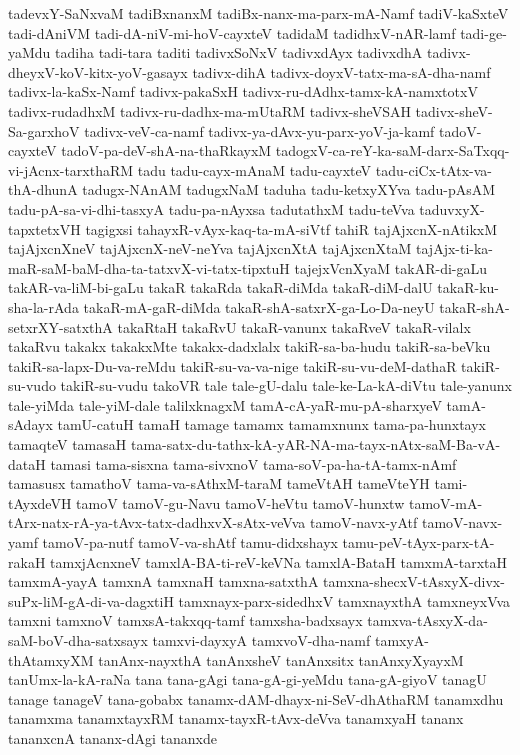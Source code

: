 {tadevxY-SaNxvaM
tadiBxnanxM
tadiBx-nanx-ma-parx-mA-Namf
tadiV-kaSxteV
tadi-dAniVM
tadi-dA-niV-mi-hoV-cayxteV
tadidaM
tadidhxV-nAR-lamf
tadi-ge-yaMdu
tadiha
tadi-tara
taditi
tadivxSoNxV
tadivxdAyx
tadivxdhA
tadivx-dheyxV-koV-kitx-yoV-gasayx
tadivx-dihA
tadivx-doyxV-tatx-ma-sA-dha-namf
tadivx-la-kaSx-Namf
tadivx-pakaSxH
tadivx-ru-dAdhx-tamx-kA-namxtotxV
tadivx-rudadhxM
tadivx-ru-dadhx-ma-mUtaRM
tadivx-sheVSAH
tadivx-sheV-Sa-garxhoV
tadivx-veV-ca-namf
tadivx-ya-dAvx-yu-parx-yoV-ja-kamf
tadoV-cayxteV
tadoV-pa-deV-shA-na-thaRkayxM
tadogxV-ca-reY-ka-saM-darx-SaTxqq-vi-jAcnx-tarxthaRM
tadu
tadu-cayx-mAnaM
tadu-cayxteV
tadu-ciCx-tAtx-va-thA-dhunA
tadugx-NAnAM
tadugxNaM
taduha
tadu-ketxyXYva
tadu-pAsAM
tadu-pA-sa-vi-dhi-tasxyA
tadu-pa-nAyxsa
tadutathxM
tadu-teVva
taduvxyX-tapxtetxVH
tagigxsi
tahayxR-vAyx-kaq-ta-mA-siVtf
tahiR
tajAjxcnX-nAtikxM
tajAjxcnXneV
tajAjxcnX-neV-neYva
tajAjxcnXtA
tajAjxcnXtaM
tajAjx-ti-ka-maR-saM-baM-dha-ta-tatxvX-vi-tatx-tipxtuH
tajejxVcnXyaM
takAR-di-gaLu
takAR-va-liM-bi-gaLu
takaR
takaRda
takaR-diMda
takaR-diM-dalU
takaR-ku-sha-la-rAda
takaR-mA-gaR-diMda
takaR-shA-satxrX-ga-Lo-Da-neyU
takaR-shA-setxrXY-satxthA
takaRtaH
takaRvU
takaR-vanunx
takaRveV
takaR-vilalx
takaRvu
takakx
takakxMte
takakx-dadxlalx
takiR-sa-ba-hudu
takiR-sa-beVku
takiR-sa-lapx-Du-va-reMdu
takiR-su-va-va-nige
takiR-su-vu-deM-dathaR
takiR-su-vudo
takiR-su-vudu
takoVR
tale
tale-gU-dalu
tale-ke-La-kA-diVtu
tale-yanunx
tale-yiMda
tale-yiM-dale
talilxknagxM
tamA-cA-yaR-mu-pA-sharxyeV
tamA-sAdayx
tamU-catuH
tamaH
tamage
tamamx
tamamxnunx
tama-pa-hunxtayx
tamaqteV
tamasaH
tama-satx-du-tathx-kA-yAR-NA-ma-tayx-nAtx-saM-Ba-vA-dataH
tamasi
tama-sisxna
tama-sivxnoV
tama-soV-pa-ha-tA-tamx-nAmf
tamasusx
tamathoV
tama-va-sAthxM-taraM
tameVtAH
tameVteYH
tami-tAyxdeVH
tamoV
tamoV-gu-Navu
tamoV-heVtu
tamoV-hunxtw
tamoV-mA-tArx-natx-rA-ya-tAvx-tatx-dadhxvX-sAtx-veVva
tamoV-navx-yAtf
tamoV-navx-yamf
tamoV-pa-nutf
tamoV-va-shAtf
tamu-didxshayx
tamu-peV-tAyx-parx-tA-rakaH
tamxjAcnxneV
tamxlA-BA-ti-reV-keVNa
tamxlA-BataH
tamxmA-tarxtaH
tamxmA-yayA
tamxnA
tamxnaH
tamxna-satxthA
tamxna-shecxV-tAsxyX-divx-suPx-liM-gA-di-va-dagxtiH
tamxnayx-parx-sidedhxV
tamxnayxthA
tamxneyxVva
tamxni
tamxnoV
tamxsA-takxqq-tamf
tamxsha-badxsayx
tamxva-tAsxyX-da-saM-boV-dha-satxsayx
tamxvi-dayxyA
tamxvoV-dha-namf
tamxyA-thAtamxyXM
tanAnx-nayxthA
tanAnxsheV
tanAnxsitx
tanAnxyXyayxM
tanUmx-la-kA-raNa
tana
tana-gAgi
tana-gA-gi-yeMdu
tana-gA-giyoV
tanagU
tanage
tanageV
tana-gobabx
tanamx-dAM-dhayx-ni-SeV-dhAthaRM
tanamxdhu
tanamxma
tanamxtayxRM
tanamx-tayxR-tAvx-deVva
tanamxyaH
tananx
tananxcnA
tananx-dAgi
tananxde
}
